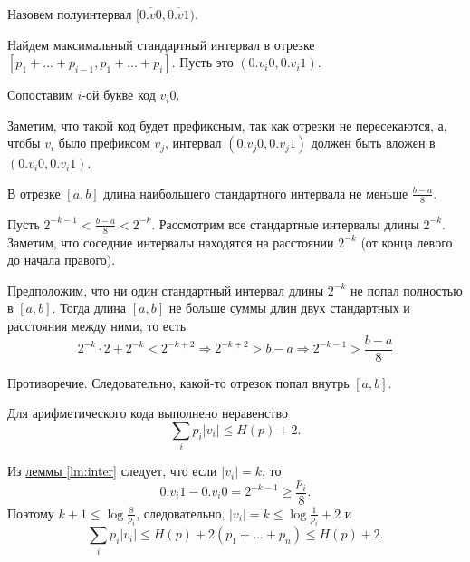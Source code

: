 Назовем  полуинтервал $ \bigl[\overline{0. v 0}, \overline{0. v 1}\bigr)$. 

Найдем максимальный стандартный интервал в отрезке $[p_1 + \dots +p_{i-1}, p_1 + \dots + p_i]$. Пусть это $ (0.v_i 0, 0.v_i 1)$.

Сопоставим $ i$-ой букве код $ v_i 0$.

Заметим, что такой код будет префиксным, так как отрезки не пересекаются, а, чтобы $ v_i$ было префиксом $ v_j$, интервал  $ (0.v_j 0, 0.v_j 1)$ должен быть вложен в $ (0.v_i 0, 0.v_i 1)$.

\begin{lm}\label{lm:inter}
	В отрезке $ [a, b]$ длина наибольшего стандартного интервала не меньше $ \frac{b-a}{8}$.
\end{lm}
\begin{proof*}
	Пусть $ 2^{-k-1} < \frac{b-a}{8} < 2^{-k}$.
	Рассмотрим все стандартные интервалы длины $ 2^{-k}$. Заметим, что соседние интервалы находятся на расстоянии $ 2^{-k}$ (от конца левого до начала правого).

	Предположим, что ни один стандартный интервал длины $ 2^{-k}$ не попал полностью в $ [a, b]$. Тогда длина  $ [a, b]$ не больше суммы длин двух стандартных и расстояния между ними,
	то есть $$ 2^{-k} \cdot 2 + 2^{-k} < 2^{-k + 2} \Longrightarrow 2^{-k + 2} > b - a \Longrightarrow 2^{-k - 1} > \frac{b - a}{8}$$

	Противоречие. Следовательно, какой-то отрезок попал внутрь $ [a, b]$.
\end{proof*}
\begin{thm}
    Для арифметического кода выполнено неравенство
	\[
		\sum_{i} p_i \lvert v_i \rvert  \le H(p) + 2
	.\] 
\end{thm}
\begin{proof*}
	Из \hyperref[lm:inter]{леммы \ref{lm:inter}} следует, что если $ \lvert v_i \rvert = k$, то 
	\[
		0.v_i 1 - 0.v_i 0 = 2^{-k-1} \ge \frac{p_i}{ 8}
	.\] 
	Поэтому $ k+1 \le \log \frac{8}{p_i}$, следовательно, $ \lvert v_i \rvert = k \le \log \frac{1}{p_i} + 2$ и
	\[
		\sum_i p _i \lvert v_i \rvert \le H(p) + 2 (p_1+ \ldots +p_n) \le H(p) + 2
	.\] 
\end{proof*}

